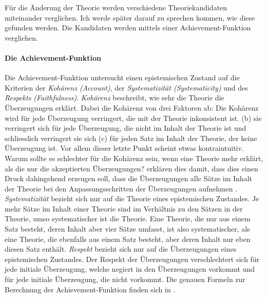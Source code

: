 \documentclass{article}
\begin{document}
Für die Änderung der Theorie werden verschiedene Theoriekandidaten miteinander verglichen. Ich werde später darauf zu sprechen kommen, wie diese gefunden werden. Die Kandidaten werden mittels einer Achievement-Funktion verglichen.

\paragraph{Die Achievement-Funktion} \label{achievement-funktion}
Die Achievement-Funktion untersucht einen epistemischen Zustand auf die Kriterien der \textit{Kohärenz (Account)}, der \textit{Systematizität (Systematicity)} und des \textit{Respekts (Faithfulness)}. \textit{Kohärenz} beschreibt, wie sehr die Theorie die Überzeugungen erklärt. Dabei die Kohärenz von drei Faktoren ab: Die Kohärenz wird für jede Überzeugung verringert, die mit der Theorie inkonsistent ist. (b) sie verringert sich für jede Überzeugung, die nicht im Inhalt der Theorie ist und schliesslich verringert sie sich (c) für jeden Satz im Inhalt der Theorie, der keine Überzeugung ist. Vor allem dieser letzte Punkt scheint etwas kontraintuitiv. Warum sollte es schlechter für die Kohärenz sein, wenn eine Theorie mehr erklärt, als die nur die akzeptierten Überzeugungen? \citeauthor{beisbart_making_2021} erklären dies damit, dass dies einen Druck dahingehend erzeugen soll, dass die Überzeugungen alle Sätze im Inhalt der Theorie bei den Anpassungsschritten der Überzeugungen aufnehmen \parencite[vgl.][S.~448]{beisbart_making_2021}.
\textit{Systematizität} bezieht sich nur auf die Theorie eines epistemischen Zustandes. Je mehr Sätze im Inhalt einer Theorie sind im Verhältnis zu den Sätzen in der Theorie, umso systematischer ist die Theorie. Eine Theorie, die nur aus einem Satz besteht, deren Inhalt aber vier Sätze umfasst, ist also systematischer, als eine Theorie, die ebenfalls aus einem Satz besteht, aber deren Inhalt nur eben diesen Satz enthält.
\textit{Respekt} bezieht sich nur auf die Überzeugungen eines epistemischen Zustandes. Der Respekt der Überzeugungen verschlechtert sich für jede initiale Überzeugung, welche negiert in den Überzeugungen vorkommt und für jede initiale Überzeugung, die nicht vorkommt.
Die genauen Formeln zur Berechnung der Achievement-Funktion finden sich in \cite[S.~464~ff.]{beisbart_making_2021}.
\end{document}
